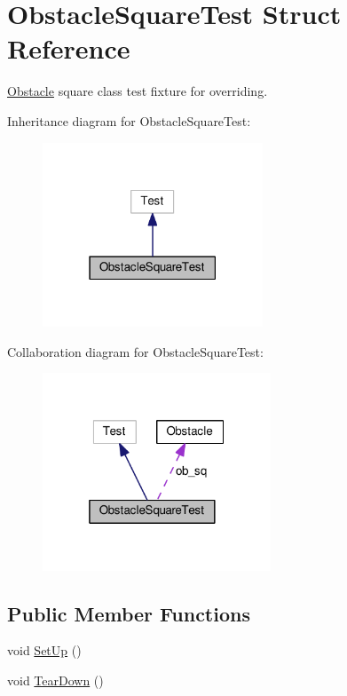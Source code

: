 \hypertarget{structObstacleSquareTest}{}\section{Obstacle\+Square\+Test Struct Reference}
\label{structObstacleSquareTest}


\hyperlink{classObstacle}{Obstacle} square class test fixture for overriding.  




Inheritance diagram for Obstacle\+Square\+Test\+:\nopagebreak
\begin{figure}[H]
\begin{center}
\leavevmode
\includegraphics[width=186pt]{structObstacleSquareTest__inherit__graph}
\end{center}
\end{figure}


Collaboration diagram for Obstacle\+Square\+Test\+:\nopagebreak
\begin{figure}[H]
\begin{center}
\leavevmode
\includegraphics[width=193pt]{structObstacleSquareTest__coll__graph}
\end{center}
\end{figure}
\subsection*{Public Member Functions}
\begin{DoxyCompactItemize}
\item 
void \hyperlink{structObstacleSquareTest_a1b4031fb1b71d0b365037a7a0c32c75b}{Set\+Up} ()
\item 
void \hyperlink{structObstacleSquareTest_a45434f333e6c64f5cf9b2aa7814d8022}{Tear\+Down} ()
\end{DoxyCompactItemize}
